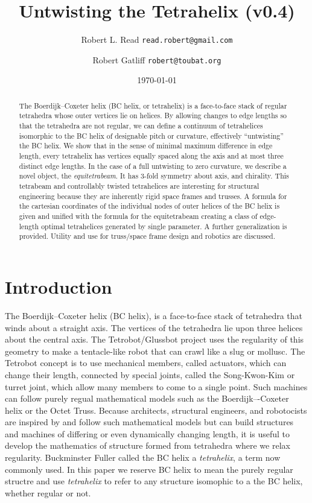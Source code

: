 \documentclass[11pt]{article}
\title{Untwisting the Tetrahelix (v0.4)}
\author{Robert L. Read \texttt{read.robert@gmail.com} \and
  Robert Gatliff \texttt{robert@toubat.org}
}
\date{\today}
\begin{document}
\maketitle


\begin{abstract}
  The Boerdijk--Coxeter helix (BC helix, or tetrahelix) is a face-to-face stack of regular tetrahedra whose outer vertices lie on helices.
  By allowing changes to edge lengths so that the tetrahedra are not regular, we can define a continuum of tetrahelices isomorphic to the
  BC helix of designable pitch or curvature, effectively ``untwisting'' the BC helix. We show that in the sense of minimal maximum
  difference in edge length, every tetrahelix has vertices equally spaced along the axis and at most three distinct edge lengths.
  In the case of a full untwisting to zero curvature, we describe a novel object, the
  \emph{equitetrabeam}.
  It has 3-fold symmetry about  axis, and chirality.  This tetrabeam and controllably twisted tetrahelices are
  interesting for structural engineering because they are inherently rigid space frames and trusses.
  A formula for the cartesian coordinates of the individual nodes of outer helices of the BC helix is given and
  unified with the formula for the equitetrabeam creating a class of edge-length optimal tetrahelices generated by single parameter.
  A further generalization is provided.
  Utility and use for truss/space frame design and robotics are discussed.
\end{abstract}


\section{Introduction}

The Boerdijk--Coxeter helix\cite{coxeter1985simplicial} (BC helix),
is a face-to-face stack of tetrahedra that winds about a straight axis.
The vertices of the tetrahedra
lie upon three
helices about the central axis.
The Tetrobot/Glussbot\cite{TetrobotBook} project
uses the regularity of this geometry to make a tentacle-like robot that can crawl like a slug or mollusc.
The Tetrobot concept
is to use mechanical members, called actuators, which can change their length, connected by special joints, called the Song-Kwon-Kim\cite{song2003spherical} or turret joint,
which allow many
members to come to a single point.
Such machines can follow purely regual mathematical models such as the Boerdijk–-Coxeter helix or the Octet Truss\cite{richard1961synergetic}.
Because architects, structural engineers, and robotocists are inspired by and follow such mathematical models but can build
structures and machines of differing or even dynamically changing length, it is useful to develop
the mathematics of structure formed from tetrahedra where we relax regularity. Buckminster Fuller called the BC helix a \emph{tetrahelix}\cite{fuller1982synergetics},
a term now commonly used. In this paper we reserve BC helix to mean the purely regular structre and use \emph{tetrahelix} to refer
to any structure isomophic to a the BC helix, whether regular or not.
\end{document}
